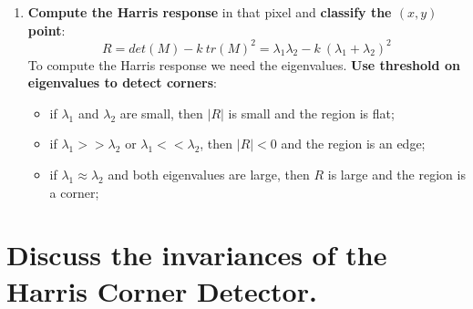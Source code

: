 \documentclass{article}
\begin{document}
\begin{enumerate}[start=0]
    \item \textbf{Compute the Harris response} in that pixel and \textbf{classify the $(x,y)$ point}:
    \begin{equation*}
        R = det(M) - k\ tr(M)^2 = \lambda_1 \lambda_2 - k\ (\lambda_1 + \lambda_2)^2
    \end{equation*}
    To compute the Harris response we need the eigenvalues.
    \textbf{Use threshold on eigenvalues to detect corners}:
    \begin{itemize}
        \item if $\lambda_1$ and $\lambda_2$ are small, then $|R|$ is small and the region is flat;
        \item if $\lambda_1 >> \lambda_2$ or $\lambda_1 <<\lambda_2$, then $|R| < 0$ and the region is an edge;
        \item if $\lambda_1 \approx \lambda_2$ and both eigenvalues are large, then $R$ is large and the region is a corner;
    \end{itemize}

\end{enumerate}

\newpage

\section{Discuss the invariances of the Harris Corner Detector.}
\end{document}
